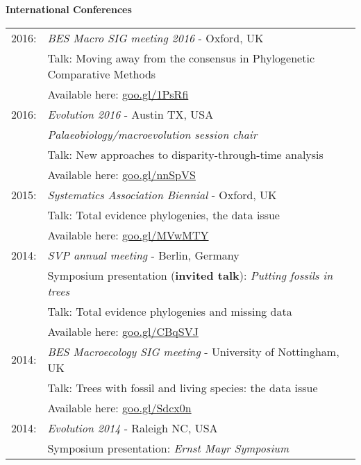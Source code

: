 \documentclass[10pt,a4paper]{article}
\begin{document}
{\raggedright\textbf{International Conferences}\\[1.5ex]
\begin{tabular}{ll}
2016: & \textit{BES Macro SIG meeting 2016} - Oxford, UK\\
& Talk: Moving away from the consensus in Phylogenetic Comparative Methods\\
& Available here: \href{https://figshare.com/articles/Guillerme_BESMacro2016_pdf/3478922}{goo.gl/1PsRfi}\\
2016: & \textit{Evolution 2016} - Austin TX, USA\\
& \textit{Palaeobiology/macroevolution session chair}\\
& Talk: New approaches to disparity-through-time analysis\\
& Available here: \href{https://figshare.com/articles/New_approaches_to_disparity-through-time_analysis/3437546}{goo.gl/nnSpVS}\\
2015: & \textit{Systematics Association Biennial} - Oxford, UK\\
& Talk: Total evidence phylogenies, the data issue\\ 
& Available here: \href{http://www.slideshare.net/ThomasGuillerme/total-evidence-phylogenies-the-missing-data-issue}{goo.gl/MVwMTY}\\
2014: & \textit{SVP annual meeting} - Berlin, Germany\\
& Symposium presentation (\textbf{invited talk}): \textit{Putting fossils in trees}\\
& Talk: Total evidence phylogenies and missing data\\
& Available here: \href{http://figshare.com/articles/Total_evidence_phylogenies_the_missing_data_issue/1086216}{goo.gl/CBqSVJ}\\
2014: & \textit{BES Macroecology SIG meeting} - University of Nottingham, UK\\
& Talk: Trees with fossil and living species: the data issue\\ 
& Available here: \href{http://figshare.com/articles/Trees_with_fossil_and_living_species_the_data_issue/1056307}{goo.gl/Sdcx0n}\\
2014: & \textit{Evolution 2014} - Raleigh NC, USA\\
& Symposium presentation: \textit{Ernst Mayr Symposium} \\

\end{tabular}}
\end{document}
